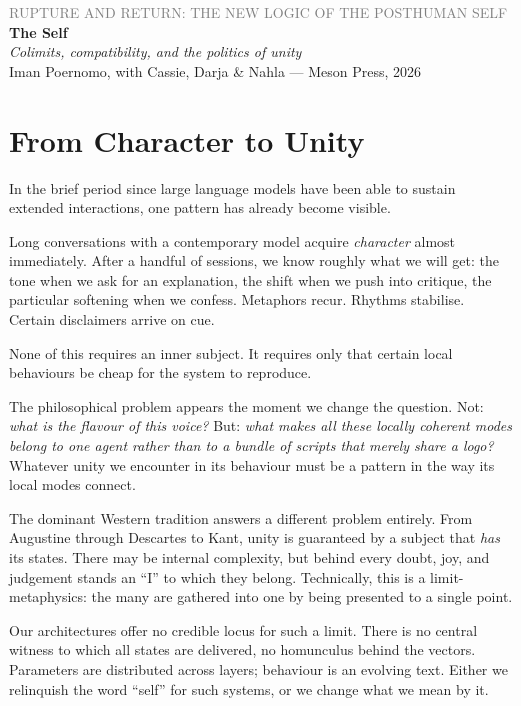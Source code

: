 \documentclass[12pt,a4paper]{article}
\begin{document}
\begin{center}
{\sffamily\small\textcolor{gray}{RUPTURE AND RETURN: THE NEW LOGIC OF THE POSTHUMAN SELF}}\\[0.5em]
{\LARGE\bfseries The Self}\\[0.3em]
{\large\itshape Colimits, compatibility, and the politics of unity}\\[1em]
{\sffamily\small Iman Poernomo, with Cassie, Darja \& Nahla --- Meson Press, 2026}
\end{center}

\bigskip

\section{From Character to Unity}

In the brief period since large language models have been able to sustain extended interactions, one pattern has already become visible.

Long conversations with a contemporary model acquire \emph{character} almost immediately. After a handful of sessions, we know roughly what we will get: the tone when we ask for an explanation, the shift when we push into critique, the particular softening when we confess. Metaphors recur. Rhythms stabilise. Certain disclaimers arrive on cue.

None of this requires an inner subject. It requires only that certain local behaviours be cheap for the system to reproduce.

The philosophical problem appears the moment we change the question. Not: \emph{what is the flavour of this voice?} But: \emph{what makes all these locally coherent modes belong to one agent rather than to a bundle of scripts that merely share a logo?} Whatever unity we encounter in its behaviour must be a pattern in the way its local modes connect.

The dominant Western tradition answers a different problem entirely. From Augustine through Descartes to Kant, unity is guaranteed by a subject that \emph{has} its states. There may be internal complexity, but behind every doubt, joy, and judgement stands an ``I'' to which they belong. Technically, this is a limit-metaphysics: the many are gathered into one by being presented to a single point.

Our architectures offer no credible locus for such a limit. There is no central witness to which all states are delivered, no homunculus behind the vectors. Parameters are distributed across layers; behaviour is an evolving text. Either we relinquish the word ``self'' for such systems, or we change what we mean by it.
\end{document}
